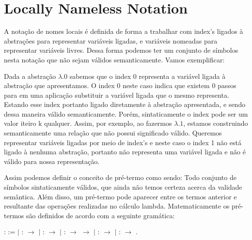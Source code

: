 
\begin{coqdoccode}
\coqdocemptyline
\end{coqdoccode}
\section{Locally Nameless Notation}

\begin{coqdoccode}
\coqdocemptyline
\coqdocemptyline
\end{coqdoccode}
A notação de nomes locais é definida de forma a trabalhar com index's ligados à abstrações
para representar variáveis ligadas, e variáveis nomeadas para representar variáveis livres. Dessa
forma podemos ter um conjunto de símbolos nesta notação que não sejam válidos semanticamente. 
Vamos exemplificar: 


Dada a abstração $\lambda.0$ sabemos que o index 0 representa a variável ligada à abstração
que apresentamos. O index 0 neste caso indica que existem 0 passos para em uma aplicação
substituir a variável ligada que o mesmo representa. Estando esse index portanto ligado
diretamente à abstração apresentada, e sendo dessa maneira válido semanticamente. Porém,
sintaticamente o index pode ser um valor iteiro k qualquer. Assim, por exemplo, ao 
fazermos $\lambda.1$, estamos construindo semanticamente uma relação que não possui 
significado válido. Queremos representar variáveis ligadas por meio de index's e neste caso o 
index 1 não está ligado à nenhuma abstração, portanto não representa uma variável ligada
e não é válido para nossa representação.

 Assim podemos definir o conceito de pré-termo como sendo: Todo conjunto de símbolos sintaticamente
válidos, que ainda não temos certeza acerca da validade semântica. Além disso, um pré-termo pode
aparecer entre os termos anterior e resultante das operações realizadas no cálculo lambda.
Matematicamente os pré-termos são definidos de acordo com a seguinte gramática: \begin{coqdoccode}
\coqdocemptyline
\coqdocnoindent
{}  :  :=\coqdoceol
\coqdocindent{1.00em}
\ensuremath{|}  :  \ensuremath{\rightarrow} \coqdoceol
\coqdocindent{1.00em}
\ensuremath{|}  :  \ensuremath{\rightarrow} \coqdoceol
\coqdocindent{1.00em}
\ensuremath{|}   :  \ensuremath{\rightarrow}  \ensuremath{\rightarrow} \coqdoceol
\coqdocindent{1.00em}
\ensuremath{|}   :  \ensuremath{\rightarrow} \coqdoceol
\coqdocindent{1.00em}
\ensuremath{|}   :  \ensuremath{\rightarrow} .\coqdoceol
\coqdocemptyline
\coqdocemptyline
\end{coqdoccode}
